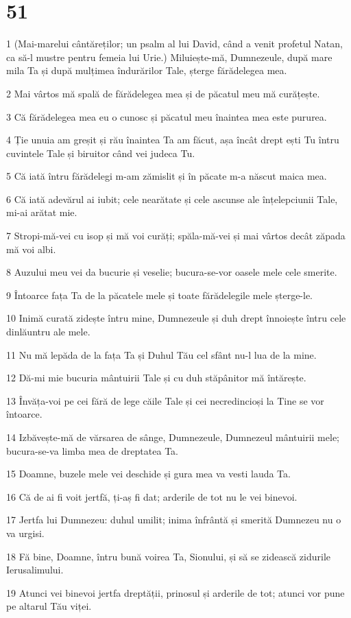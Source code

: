 \chapter{51}

\par 1 (Mai-marelui cântăreților; un psalm al lui David, când a venit profetul Natan, ca să-l mustre pentru femeia lui Urie.) Miluiește-mă, Dumnezeule, după mare mila Ta și după mulțimea îndurărilor Tale, șterge fărădelegea mea.
\par 2 Mai vârtos mă spală de fărădelegea mea și de păcatul meu mă curățește.
\par 3 Că fărădelegea mea eu o cunosc și păcatul meu înaintea mea este pururea.
\par 4 Ție unuia am greșit și rău înaintea Ta am făcut, așa încât drept ești Tu întru cuvintele Tale și biruitor când vei judeca Tu.
\par 5 Că iată întru fărădelegi m-am zămislit și în păcate m-a născut maica mea.
\par 6 Că iată adevărul ai iubit; cele nearătate și cele ascunse ale înțelepciunii Tale, mi-ai arătat mie.
\par 7 Stropi-mă-vei cu isop și mă voi curăți; spăla-mă-vei și mai vârtos decât zăpada mă voi albi.
\par 8 Auzului meu vei da bucurie și veselie; bucura-se-vor oasele mele cele smerite.
\par 9 Întoarce fața Ta de la păcatele mele și toate fărădelegile mele șterge-le.
\par 10 Inimă curată zidește întru mine, Dumnezeule și duh drept înnoiește întru cele dinlăuntru ale mele.
\par 11 Nu mă lepăda de la fața Ta și Duhul Tău cel sfânt nu-l lua de la mine.
\par 12 Dă-mi mie bucuria mântuirii Tale și cu duh stăpânitor mă întărește.
\par 13 Învăța-voi pe cei fără de lege căile Tale și cei necredincioși la Tine se vor întoarce.
\par 14 Izbăvește-mă de vărsarea de sânge, Dumnezeule, Dumnezeul mântuirii mele; bucura-se-va limba mea de dreptatea Ta.
\par 15 Doamne, buzele mele vei deschide și gura mea va vesti lauda Ta.
\par 16 Că de ai fi voit jertfă, ți-aș fi dat; arderile de tot nu le vei binevoi.
\par 17 Jertfa lui Dumnezeu: duhul umilit; inima înfrântă și smerită Dumnezeu nu o va urgisi.
\par 18 Fă bine, Doamne, întru bună voirea Ta, Sionului, și să se zidească zidurile Ierusalimului.
\par 19 Atunci vei binevoi jertfa dreptății, prinosul și arderile de tot; atunci vor pune pe altarul Tău viței.

